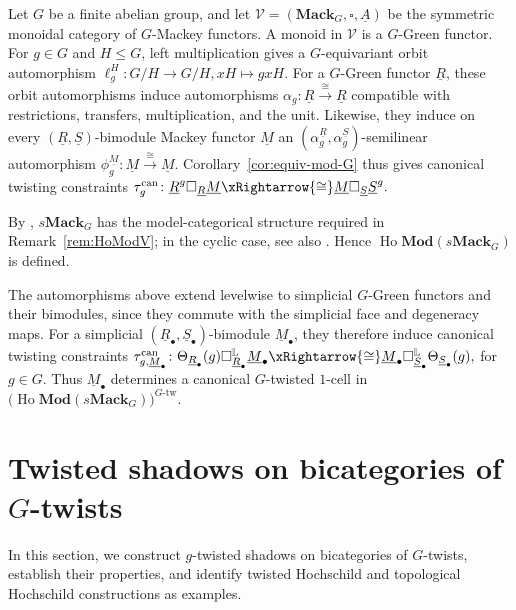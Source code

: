 \documentclass[11pt,oneside]{amsart}
\DeclareMathOperator{\Ho}{Ho}
\numberwithin{equation}{section}
\numberwithin{figure}{section}
\theoremstyle{plain}
\theoremstyle{definition}
\theoremstyle{remark}
\begin{document}
\begin{example}\label{ex:green-functors}
Let \(G\) be a finite abelian group, and let
\(
\mathcal V
=
(\mathbf{Mack}_G,\square,\underline A)
\)
be the symmetric monoidal category of \(G\)-Mackey functors.  A monoid
in \(\mathcal V\) is a \(G\)-Green functor.  For \(g\in G\) and
\(H\leq G\), left multiplication gives a \(G\)-equivariant orbit
automorphism
\(
\ell_g^H\colon
G/H\rightarrow G/H,
xH\mapsto gxH.
\)
For a \(G\)-Green functor \(\underline R\), these orbit
automorphisms induce automorphisms
\(
\alpha_g\colon
\underline R\xrightarrow{\cong}\underline R
\)
compatible with restrictions, transfers, multiplication, and the
unit.  Likewise, they induce on every
\((\underline R,\underline S)\)-bimodule Mackey functor
\(\underline M\) an
\((\alpha_g^{\underline R},\alpha_g^{\underline S})\)-semilinear
automorphism
\(
\phi_g^{\underline M}\colon
\underline M\xrightarrow{\cong}\underline M.
\)
Corollary~\ref{cor:equiv-mod-G} thus gives canonical twisting
constraints
\(
\tau_{g}^{\mathrm{can}}\colon
\underline R^g\square_{\underline R}\underline M
\xRightarrow{\cong}
\underline M\square_{\underline S}\underline S^g.
\)


By \cite[Theorem~4.3 and Proposition~4.4]{BGHL},
\(s\mathbf{Mack}_G\) has the model-categorical structure required in
Remark~\ref{rem:HoModV}; in the cyclic case, see also
\cite[Example~4.1.1(2)]{AGHKK}. Hence
\(\Ho\mathbf{Mod}(s\mathbf{Mack}_G)\) is defined.

The automorphisms above extend levelwise to simplicial \(G\)-Green
functors and their bimodules, since they commute with the simplicial
face and degeneracy maps. For a simplicial
\((\underline R_\bullet,\underline S_\bullet)\)-bimodule
\(\underline M_\bullet\), they therefore induce canonical twisting
constraints
\(
\tau_{g,\underline M_\bullet}^{\mathrm{can}}\colon
\Theta_{\underline R_\bullet}(g)
\square_{\underline R_\bullet}^{\mathbb L}
\underline M_\bullet
\xRightarrow{\cong}
\underline M_\bullet
\square_{\underline S_\bullet}^{\mathbb L}
\Theta_{\underline S_\bullet}(g),\) for \(g\in G.
\)
Thus \(\underline M_\bullet\) determines a canonical \(G\)-twisted
\(1\)-cell in
\(\bigl(\Ho\mathbf{Mod}(s\mathbf{Mack}_G)\bigr)^{G\text{-tw}}.
\)
\end{example}


 
 




\section{Twisted shadows on bicategories of $G$-twists}
In this section, we construct \(g\)-twisted shadows on bicategories of
\(G\)-twists, establish their properties, and identify
twisted Hochschild and topological Hochschild constructions as examples.
\end{document}
